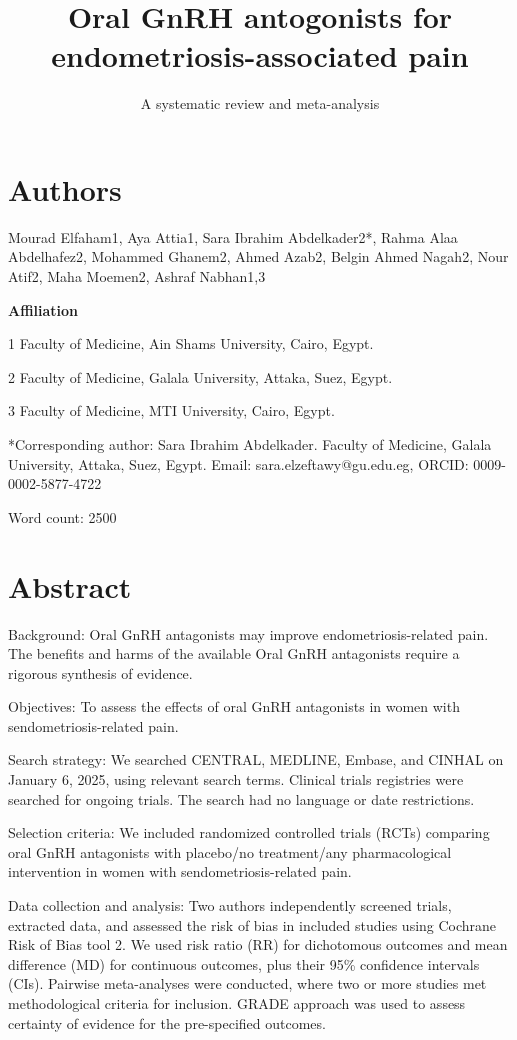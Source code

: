 \documentclass[
  letterpaper,
  DIV=11,
  numbers=noendperiod]{scrartcl}
\title{Oral GnRH antogonists for endometriosis-associated pain}
\subtitle{A systematic review and meta-analysis}
\author{}
\date{}
\begin{document}
\maketitle


\section{Authors}\label{authors}

Mourad Elfaham1, Aya Attia1, Sara Ibrahim Abdelkader2*, Rahma Alaa
Abdelhafez2, Mohammed Ghanem2, Ahmed Azab2, Belgin Ahmed Nagah2, Nour
Atif2, Maha Moemen2, Ashraf Nabhan1,3

\textbf{Affiliation}

1 Faculty of Medicine, Ain Shams University, Cairo, Egypt.

2 Faculty of Medicine, Galala University, Attaka, Suez, Egypt.

3 Faculty of Medicine, MTI University, Cairo, Egypt.

*Corresponding author: Sara Ibrahim Abdelkader. Faculty of Medicine,
Galala University, Attaka, Suez, Egypt. Email: sara.elzeftawy@gu.edu.eg,
ORCID: 0009-0002-5877-4722

Word count: 2500

\section{Abstract}\label{abstract}

Background: Oral GnRH antagonists may improve endometriosis-related
pain. The benefits and harms of the available Oral GnRH antagonists
require a rigorous synthesis of evidence.

Objectives: To assess the effects of oral GnRH antagonists in women with
sendometriosis-related pain.

Search strategy: We searched CENTRAL, MEDLINE, Embase, and CINHAL on
January 6, 2025, using relevant search terms. Clinical trials registries
were searched for ongoing trials. The search had no language or date
restrictions.

Selection criteria: We included randomized controlled trials (RCTs)
comparing oral GnRH antagonists with placebo/no treatment/any
pharmacological intervention in women with sendometriosis-related pain.

Data collection and analysis: Two authors independently screened trials,
extracted data, and assessed the risk of bias in included studies using
Cochrane Risk of Bias tool 2. We used risk ratio (RR) for dichotomous
outcomes and mean difference (MD) for continuous outcomes, plus their
95\% confidence intervals (CIs). Pairwise meta-analyses were conducted,
where two or more studies met methodological criteria for inclusion.
GRADE approach was used to assess certainty of evidence for the
pre-specified outcomes.
\end{document}
